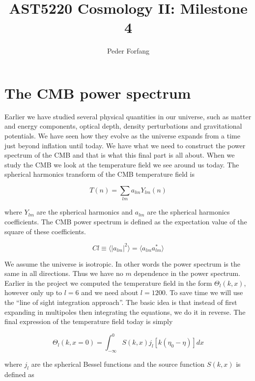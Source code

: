 \documentclass[norsk,a4paper,12pt]{article}
\begin{document}
\title{AST5220 Cosmology II: Milestone 4}
\author{Peder Forfang}
\maketitle


\section{The CMB power spectrum}

Earlier we have studied several physical quantities in our universe, such as matter and energy components, optical depth, density perturbations and gravitational potentials. We have seen how they evolve as the universe expands from a time just beyond inflation until today. We have what we need to construct the power spectrum of the CMB and that is what this final part is all about. When we study the CMB we look at the temperature field we see around us today. The spherical harmonics transform of the CMB temperature field is

\begin{equation}
 T(n) = \sum_{lm} a_{lm}Y_{lm}(n)
\end{equation}

where $Y_{lm}$ are the spherical harmonics and $a_{lm} $ are the spherical harmonics coefficients. The CMB power spectrum is defined as the expectation value of the square of these coefficients. 

\begin{equation}
 Cl\equiv \langle|a_{lm}|^2\rangle = \langle a_{lm}a_{lm}^*\rangle
\end{equation}

We assume the universe is isotropic. In other words the power spectrum is the same in all directions. Thus we have no $m$ dependence in the power spectrum. Earlier in the project we computed the temperature field in the form $ \Theta_l(k,x)$, however only up to $l=6$ and we need about $l = 1200$. To save time we will use the ``line of sight integration approach''. The basic idea is that instead of first expanding in multipoles then integrating the equations, we do it in reverse. The final expression of the temperature field today is simply

\begin{equation}
 \Theta_l(k,x=0) = \int_{-\infty}^0 S(k,x)j_l[k(\eta_0-\eta)]dx
\end{equation}

where $j_l$ are the spherical Bessel functions and the source function $S(k,x)$ is defined as
\end{document}
